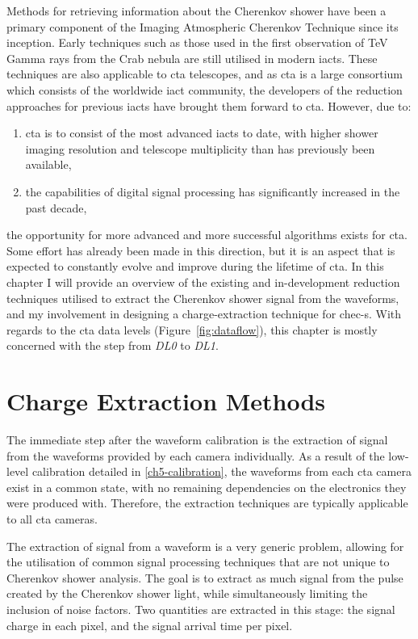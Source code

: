 Methods for retrieving information about the Cherenkov shower have been a primary component of the Imaging Atmospheric Cherenkov Technique since its inception. Early techniques such as those used in the first observation of TeV Gamma rays from the Crab nebula \cite{Weekes1989} are still utilised in modern \glspl{iact}. These techniques are also applicable to \gls{cta} telescopes, and as \gls{cta} is a large consortium which consists of the worldwide \gls{iact} community, the developers of the reduction approaches for previous \glspl{iact} have brought them forward to \gls{cta}. However, due to:
\begin{enumerate}[label=(\alph*)]
	\item \gls{cta} is to consist of the most advanced \glspl{iact} to date, with higher shower imaging resolution and telescope multiplicity than has previously been available,
	\item the capabilities of digital signal processing has significantly increased in the past decade,
\end{enumerate}
the opportunity for more advanced and more successful algorithms exists for \gls{cta}. Some effort has already been made in this direction, but it is an aspect that is expected to constantly evolve and improve during the lifetime of \gls{cta}. In this chapter I will provide an overview of the existing and in-development reduction techniques utilised to extract the Cherenkov shower signal from the waveforms, and my involvement in designing a charge-extraction technique for \gls{chec-s}. With regards to the \gls{cta} data levels (Figure~\ref{fig:dataflow}), this chapter is mostly concerned with the step from \textit{DL0} to \textit{DL1}.

\section{Charge Extraction Methods}

The immediate step after the waveform calibration is the extraction of signal from the waveforms provided by each camera individually. As a result of the low-level calibration detailed in \ref{ch5-calibration}, the waveforms from each \gls{cta} camera exist in a common state, with no remaining dependencies on the electronics they were produced with. Therefore, the extraction techniques are typically applicable to all \gls{cta} cameras. 

The extraction of signal from a waveform is a very generic problem, allowing for the utilisation of common signal processing techniques that are not unique to Cherenkov shower analysis. The goal is to extract as much signal from the pulse created by the Cherenkov shower light, while simultaneously limiting the inclusion of noise factors. Two quantities are extracted in this stage: the signal charge in each pixel, and the signal arrival time per pixel. 

